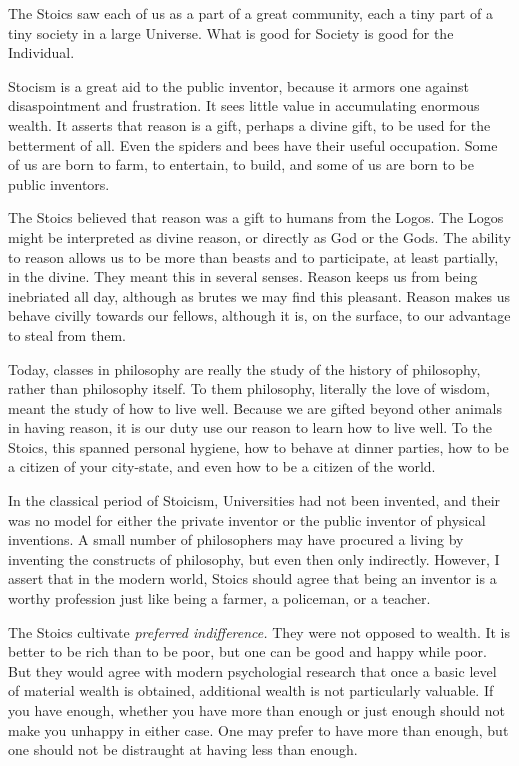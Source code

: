 \documentclass[
	fontsize=10pt, %
	twoside=false, %
	secnumdepth=1, %
]{kaobook}
\begin{document}
The Stoics saw each of us as a part of a great community, each a
tiny part of a tiny society in a large Universe.
What is good for Society is good for the Individual.

Stocism is a great aid to the public inventor,
because it armors one against disaspointment and frustration.
It sees little value in accumulating enormous wealth.
It asserts that reason is a gift, perhaps a divine gift,
to be used for the betterment of all.
Even the spiders and bees have their useful occupation.
Some of us are born to farm, to entertain, to build, and
some of us are born to be public inventors.

The Stoics believed that reason was a gift to humans from the Logos.
The Logos might be interpreted as divine reason, or directly
as God or the Gods.
The ability to reason allows us to be more than beasts
and to participate, at least partially, in the divine.
They meant this in several senses.
Reason keeps us from being inebriated
all day, although as brutes we may find this pleasant.
Reason makes us behave civilly towards our
fellows, although it is, on the surface, to our advantage
to steal from them.

Today, classes in philosophy are really the study
of the history of philosophy, rather than philosophy itself.
To them philosophy, literally the love of wisdom,
meant the study of how to live well.
Because we are gifted beyond other animals in having
reason, it is our duty use our reason to learn how to live
well.
To the Stoics, this spanned personal hygiene,
how to behave at dinner parties, how to be a citizen
of your city-state, and even how to be a citizen of the world.

In the classical period of Stoicism, Universities had
not been invented, and their was no model for either
the private inventor or the public inventor of physical
inventions.
A small number of philosophers may have procured a
living by inventing the constructs of philosophy, but
even then only indirectly.
However, I assert that in the modern world, Stoics
should agree that being an inventor is a worthy profession
just like being a farmer, a policeman, or a teacher.

The Stoics cultivate {\em preferred indifference.}
They were not opposed to wealth.
It is better to be rich than to be poor,
but one can be good and happy while poor.
But they would agree with modern psychologial research
that once a basic level of material wealth is obtained,
additional wealth is not particularly valuable.
If you have enough, whether you have more than enough
or just enough should not make you unhappy in either case.
One may prefer to have more than enough, but one should
not be distraught at having less than enough.
\end{document}
